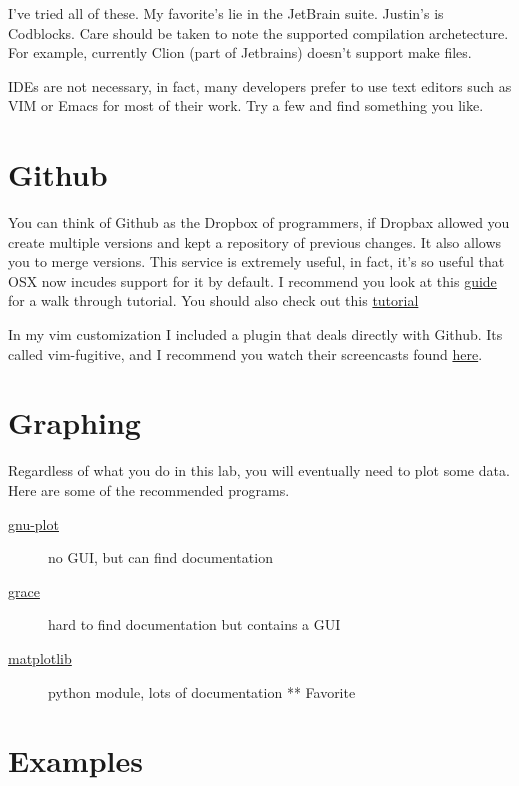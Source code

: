 \documentclass{article}
\begin{document}
I've tried all of these. 
My favorite's lie in the JetBrain suite. 
Justin's is Codblocks. 
Care should be taken to note the supported compilation archetecture. 
For example, currently Clion (part of Jetbrains) doesn't support make files.

IDEs are not necessary, in fact, many developers prefer to use text editors such as VIM or Emacs for most of their work.
Try a few and find something you like.


\section*{Github}
You can think of Github as the Dropbox of programmers, if Dropbax allowed you create multiple versions and kept a repository of previous changes.
It also allows you to merge versions.
This service is extremely useful, in fact, it's so useful that OSX now incudes support for it by default.
I recommend you look at this \href{https://githowto.com/}{guide} for a walk through tutorial.
You should also check out this \href{https://www.atlassian.com/git/tutorials/}{tutorial}

In my vim customization I included a plugin that deals directly with Github.
Its called vim-fugitive, and I recommend you watch their screencasts found \href{https://github.com/tpope/vim-fugitive}{here}.


\section*{Graphing}

Regardless of what you do in this lab, you will eventually need to plot some data.
Here are some of the recommended programs.

\begin{description}
  \item[\href{http://alvinalexander.com/technology/gnuplot-charts-graphs-examples}{gnu-plot}] no GUI, but can find documentation
  \item[\href{http://www.phy.ohiou.edu/~elster/phys5071/extras/xmgrace\_tutorial.pdf}{grace}] hard to find documentation but contains a GUI
  \item[\href{http://matplotlib.org/}{matplotlib}] python module, lots of documentation ** Favorite
\end{description} 

\section*{Examples}
\end{document}
